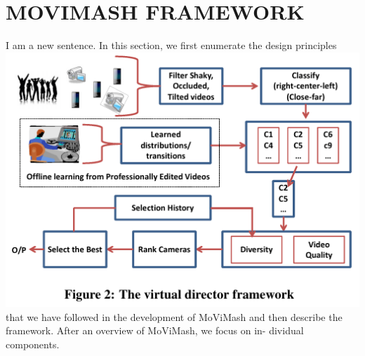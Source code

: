 \documentclass{sig-alternate}
\begin{document}
\section{MOVIMASH FRAMEWORK}
I am a new sentence.
In this section, we first enumerate the design principles \includegraphics[scale=1]{two.pdf}\\
that we
have followed in the development of MoViMash and then describe
the framework. After an overview of MoViMash, we focus on in-
dividual components.
\end{document}
